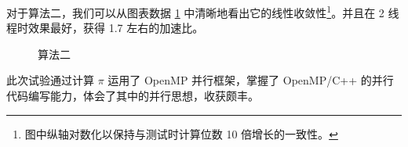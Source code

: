 \documentclass{zjureport-zh}
\begin{document}
\par 对于算法二，我们可以从图表数据 \ref{fig2} 中清晰地看出它的线性收敛性\footnote{图中纵轴对数化以保持与测试时计算位数 10 倍增长的一致性。}。并且在 2 线程时效果最好，获得 1.7 左右的加速比。

\begin{figure}[h] \label{fig2}
	\centering
	\caption{算法二}
\end{figure}

\par 此次试验通过计算 $\pi$ 运用了 OpenMP 并行框架，掌握了 OpenMP/C++ 的并行代码编写能力，体会了其中的并行思想，收获颇丰。
\end{document}
